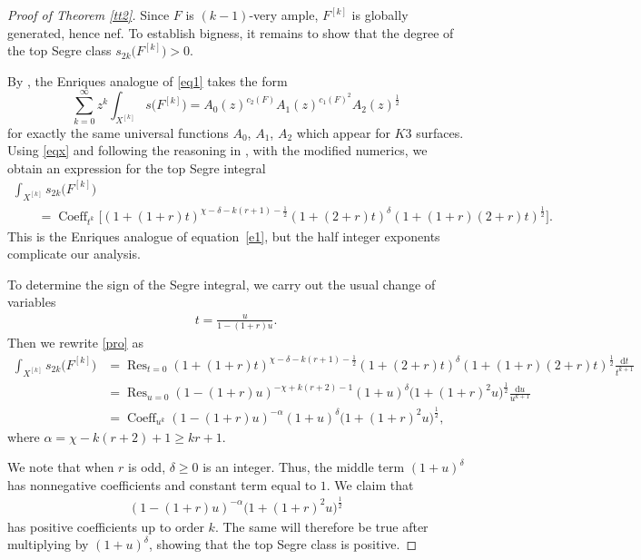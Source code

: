 \documentclass[10pt,a4paper]{amsart}
\numberwithin{equation}{section}
\begin{document}
\begin{proof}[Proof of Theorem \ref{tt2}] Since $F$ is $(k-1)$-very ample, $F^{[k]}$ is globally generated, hence nef. To establish bigness, it remains to show that the degree of the top Segre class $s_{2k}\big(F^{[k]}\big)>0$.

By \cite[Theorem 1]{MOP}, the Enriques analogue of \eqref{eq1} takes the form \begin{equation}\label{eqx}
\sum_{k=0}^{\infty} z^k \int_{X^{[k]}} s \big(F^{[k]}\big) = A_0(z)^{c_2(F)} A_1(z)^{c_1(F)^2} A_2(z)^{\frac{1}{2}}
\end{equation}
for exactly the same universal functions $A_0$, $A_1$, $A_2$ which appear for $K3$ surfaces. Using \eqref{eqx} and following the reasoning in \cite[p.~11]{MOP}, with the modified numerics, we obtain an expression for the top Segre integral
\begin{gather}\label{pro}
\int_{X^{[k]}} s_{2k}\big(F^{[k]}\big)\nonumber
\\ \qquad
{}=\operatorname{Coeff}_{t^k} \big[(1+(1+r)t)^{\chi-\delta-k(r+1) - \frac{1}{2}} (1+(2+r)t)^{\delta} (1+(1+r)(2+r)t)^{\frac{1}{2}}\big].
\end{gather}
This is the Enriques analogue of equation~\eqref{e1}, but the half integer exponents complicate our analysis.

To determine the sign of the Segre integral, we carry out the usual change of variables
\begin{gather*}
t=\frac{u}{1-(1+r)u}.
\end{gather*}
{\samepage Then we rewrite \eqref{pro} as
\begin{align*}
\int_{X^{[k]}} s_{2k}\big(F^{[k]}\big) &= \operatorname{Res}_{t=0} (1\!+(1\!+r)t)^{\chi-\delta-k(r+1) - \frac{1}{2}} (1\!+(2\!+r)t)^{\delta} (1\!+(1\!+r)(2\!+r)t)^{\frac{1}{2}}\frac{\mathrm dt}{t^{k+1}}
\\
&=\operatorname{Res}_{u=0} (1-(1+r)u)^{-\chi+k(r+2)-1}(1+u)^{\delta} \big(1+(1+r)^2u\big)^{\frac{1}{2}} \frac{\mathrm du}{u^{k+1}}
\\
&=\operatorname{Coeff}_{u^k} (1-(1+r)u)^{-\alpha} (1+u)^{\delta}\big(1+(1+r)^2u\big)^{\frac{1}{2}},
\end{align*}
where $\alpha=\chi-k(r+2)+1\geq kr+1$.}

We note that when $r$ is odd, $\delta\geq 0$ is an integer. Thus, the middle term $(1+u)^{\delta}$ has nonnegative coefficients and constant term equal to $1$. We claim that
\begin{gather*}
(1-(1+r)u)^{-\alpha}\big(1+(1+r)^2u\big)^{\frac{1}{2}}
\end{gather*}
has positive coefficients up to order $k$. The same will therefore be true after multiplying by $(1+u)^{\delta}$, showing that the top Segre class is positive.


\end{proof}
\end{document}
